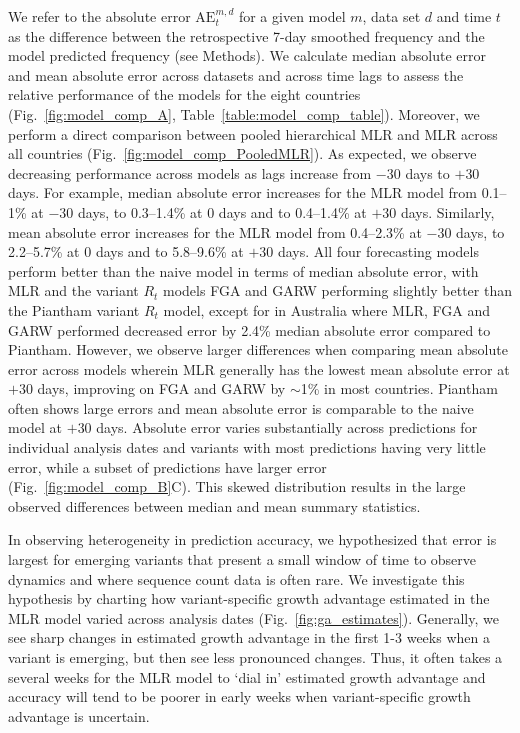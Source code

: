 \documentclass[11pt,oneside,letterpaper]{article}
\begin{document}
We refer to the absolute error $\mathrm{AE}_{t}^{m,d}$ for a given model $m$, data set $d$ and time $t$ as the difference between the retrospective 7-day smoothed frequency and the model predicted frequency (see Methods).
We calculate median absolute error and mean absolute error across datasets and across time lags to assess the relative performance of the models for the eight countries (Fig.~\ref{fig:model_comp_A}, Table~\ref{table:model_comp_table}).
Moreover, we perform a direct comparison between pooled hierarchical MLR and MLR across all countries (Fig.~\ref{fig:model_comp_PooledMLR}). 
As expected, we observe decreasing performance across models as lags increase from $-30$ days to $+30$ days.
For example, median absolute error increases for the MLR model from 0.1--1\% at $-30$ days, to 0.3--1.4\% at 0 days and to 0.4--1.4\% at $+30$ days.
Similarly, mean absolute error increases for the MLR model from 0.4--2.3\% at $-30$ days, to 2.2--5.7\% at 0 days and to 5.8--9.6\% at $+30$ days.
All four forecasting models perform better than the naive model in terms of median absolute error, with MLR and the variant $R_t$ models FGA and GARW performing slightly better than the Piantham variant $R_t$ model, except for in Australia where MLR, FGA and GARW performed decreased error by 2.4\% median absolute error compared to Piantham.
However, we observe larger differences when comparing mean absolute error across models wherein MLR generally has the lowest mean absolute error at $+30$ days, improving on FGA and GARW by $\sim$1\% in most countries.
Piantham often shows large errors and mean absolute error is comparable to the naive model at $+30$ days.
Absolute error varies substantially across predictions for individual analysis dates and variants with most predictions having very little error, while a subset of predictions have larger error (Fig.~\ref{fig:model_comp_B}C).
This skewed distribution results in the large observed differences between median and mean summary statistics.

In observing heterogeneity in prediction accuracy, we hypothesized that error is largest for emerging variants that present a small window of time to observe dynamics and where sequence count data is often rare.
We investigate this hypothesis by charting how variant-specific growth advantage estimated in the MLR model varied across analysis dates (Fig.~\ref{fig:ga_estimates}).
Generally, we see sharp changes in estimated growth advantage in the first 1-3 weeks when a variant is emerging, but then see less pronounced changes.
Thus, it often takes a several weeks for the MLR model to `dial in' estimated growth advantage and accuracy will tend to be poorer in early weeks when variant-specific growth advantage is uncertain.
\end{document}
